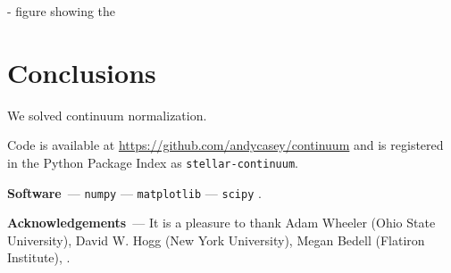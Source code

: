 \documentclass[modern]{aastex631}
\renewcommand{\paragraph}[1]{\medskip\par\noindent\textbf{#1}~---}
\begin{document}
- figure showing the 

\section{Conclusions}\label{sec:conclusions}

We solved continuum normalization.


Code is available at \url{https://github.com/andycasey/continuum} and is registered in the Python Package Index as \texttt{stellar-continuum}. 

\paragraph{Software}
\texttt{numpy} \citep{numpy} ---
\texttt{matplotlib} \citep{matplotlib} ---
\texttt{scipy} \citep{scipy}.

\paragraph{Acknowledgements}
It is a pleasure to thank
    Adam Wheeler (Ohio State University),
    David W. Hogg (New York University),
    Megan Bedell (Flatiron Institute),
.

%
\end{document}
